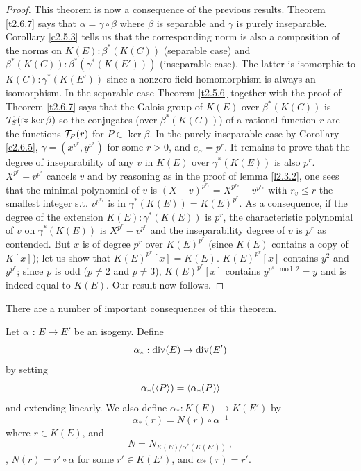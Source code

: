 \begin{proof}
This theorem is now a consequence of the previous results. Theorem \ref{t2.6.7} says that $\alpha =\gamma\circ\beta$ where $\beta$ is separable and $\gamma$ is purely inseparable. Corollary \ref{c2.5.3} tells us that the corresponding norm is also a composition of the norms on $K(E):\beta^*(K(C))$ (separable case) and $\beta^*(K(C)):\beta^*(\gamma^*(K(E')))$ (inseparable case). The latter is isomorphic to $K(C):\gamma^*(K(E'))$ since a nonzero field homomorphism is always an isomorphism. In the separable case Theorem \ref{t2.5.6} together with the proof of Theorem \ref{t2.6.7} says that the Galois group of $K(E)$ over $\beta^{*}(K(C))$ is $\mathcal{T}_{S}(\approx \ker \beta)$ so the conjugates (over $\beta^{*}(K(C))$) of a rational function $r$ are the functions $\mathcal{T}_{P}(r)$ for $ P\in \ker \beta$. In the purely inseparable case by Corollary \ref{c2.6.5}, $\gamma=\left(x^{p^{r}}, y^{p^{r}}\right)$ for some $r>0$, and $e_{\alpha}=p^{r}$. It remains to prove  that the degree of inseparability of any $v$ in $K(E)$ over $\gamma^*(K(E))$ is also $p^r$. $X^{p^r} - v^{p^r}$ cancels $v$ and by reasoning as in the proof of lemma \ref{l2.3.2}, one sees that the minimal polynomial of $v$ is $(X-v)^{p^{r_v}}=X^{p^{r_v}}-v^{p^{r_v}}$ with $r_v \leq r$ the smallest integer s.t. $v^{p^{r_v}}$ is in $\gamma^*(K(E)) = K(E)^{p^r}$. 
As a consequence,  if the degree of the extension $K(E):\gamma^*(K(E))$ is $p^r$, the characteristic polynomial of $v$ on $\gamma^*(K(E))$ is $X^{p^{r}}-v^{p^{r}}$ and the inseparability degree of $v$ is $p^r$ as contended.  But $x$ is of degree $p^r$ over $K(E)^{p^r}$ (since $K(E)$ contains a copy of $K[x]$); let us show that $K(E)^{p^r}[x]=K(E)$. $K(E)^{p^r}[x]$ contains $y^2$ and $y^{p^r}$; since $p$ is odd ($p\neq 2$ and $p\neq 3$), $K(E)^{p^r}[x]$ contains $y^{p^s \mod 2} = y$ and is indeed equal to $K(E)$.
Our result now follows.

\end{proof}

There are a number of important consequences of this theorem.

\begin{defi}
\label{d2.6.13}
Let $\alpha$ : $E\rightarrow E'$ be an isogeny. Define
$$
\alpha_{*}:\operatorname{div}(E)\rightarrow \operatorname{div}(E')
$$
by setting
$$
\alpha_{*}(\left\langle P \right \rangle)=\left\langle \alpha_{*}(P) \right \rangle
$$
and extending linearly.
We also define $\alpha_{*}:K(E)\rightarrow K(E')$ by
$$
\alpha_{*}(r)=N(r)\circ\alpha^{-1}
$$
where $r\in K(E)$, and
$$
N=N_{K(E)/\alpha^{*}(K(E'))}\ ,
$$
\ie, $ N(r)=r'\circ\alpha$ for some $r'\in K(E')$, and $\alpha_{*}(r)=r'$.
\end{defi}

